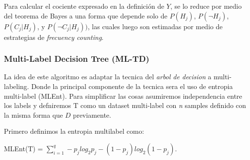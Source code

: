 \documentclass{article}
\begin{document}
        Para calcular el cociente expresado en la definición de $Y$, se lo reduce por medio del teorema de Bayes a una forma que depende solo de $P(H_j)$, $P(\neg H_j)$, $P(C_j |H_j)$, y $P(\neg C_j |H_j))$, las cuales luego son  estimadas por medio de estrategias de \textit{frecuency counting}.
        
        
        \subsubsection{Multi-Label Decision Tree (ML-TD)}
        \newcommand{\Tau}{\mathrm{T}}
            La idea de este algoritmo es adaptar la tecnica del \textit{arbol de decision} a multi-labeling. Donde la principal componente de la tecnica sera el uso de entropia multi-label (MLEnt). Para simplificar las cosas asumiremos independencia entre los labels y defniremos $\Tau$ como un dataset multi-label con \textit{n} samples definido con la misma forma que $D$ previamente.
            
            Primero definimos la entropia multilabel como:
            
            \begin{center}
                MLEnt($\Tau$) = $\sum_{i=1}^{q} -p_j log_2 p_j - (1 - p_j) log_2 (1 - p_j).$ 
            \end{center}
            
\end{document}
